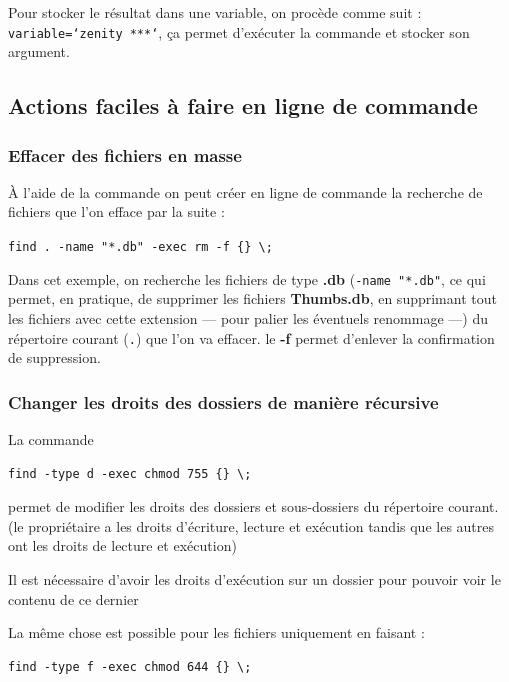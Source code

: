 \documentclass[a4paper,twoside]{article}
\begin{document}
\begin{remarque}
Pour stocker le résultat dans une variable, on procède comme suit : \texttt{variable=`zenity ***`}, ça permet d'exécuter la commande et stocker son argument.
\end{remarque}

\subsection{Actions faciles à faire en ligne de commande}
\subsubsection{Effacer des fichiers en masse}
À l'aide de la commande  on peut créer en ligne de commande la recherche de fichiers que l'on efface par la suite :

\verb|find . -name "*.db" -exec rm -f {} \;|


Dans cet exemple, on recherche les fichiers de type \textbf{.db} (\verb|-name "*.db"|, ce qui permet, en pratique, de supprimer les fichiers \textbf{Thumbs.db}, en supprimant tout les fichiers avec cette extension --- pour palier les éventuels renommage ---) du répertoire courant (\verb|.|) que l'on va effacer. le \textbf{-f} permet d'enlever la confirmation de suppression. 

\subsubsection{Changer les droits des dossiers de manière récursive}
La commande 
\begin{verbatim}
find -type d -exec chmod 755 {} \;
\end{verbatim}
permet de modifier les droits des dossiers et sous-dossiers du répertoire courant. (le propriétaire a les droits d'écriture, lecture et exécution tandis que les autres ont les droits de lecture et exécution)

\begin{attention}
Il est nécessaire d'avoir les droits d'exécution sur un dossier pour pouvoir voir le contenu de ce dernier
\end{attention}
 

\begin{remarque}
La même chose est possible pour les fichiers uniquement en faisant :
\begin{verbatim}
find -type f -exec chmod 644 {} \;
\end{verbatim}
\end{remarque}
\end{document}
